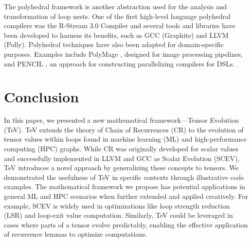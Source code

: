 \documentclass{article}
\begin{document}
    The polyhedral framework is another abstraction used for the analysis and transformation of loop nests.
     One of the first high-level language polyhedral compilers was the R-Stream 3.0 Compiler \cite{Lethin2008RStream3C}
      and several tools and libraries have been developed to harness its benefits, such as GCC (Graphite) and LLVM
       (Polly). Polyhedral techniques have also been adapted for domain-specific purposes. Examples include 
       PolyMage \cite{Polymage}, designed for image processing pipelines, and PENCIL \cite{PENCIL}, 
       an approach for constructing parallelizing compilers for DSLs.


    \section{Conclusion}       
    In this paper, we presented a new mathematical framework—Tensor Evolution (TeV).
     TeV extends the theory of Chain of Recurrences (CR) to the evolution of tensor values
      within loops found in machine learning (ML) and high-performance computing (HPC) graphs.
       While CR was originally developed for scalar values and successfully implemented in LLVM and GCC as Scalar Evolution (SCEV), TeV introduces a novel approach by generalizing these concepts to tensors.
    We demonstrated the usefulness of TeV in specific contexts through illustrative code examples.
     The mathematical framework we propose has potential applications in general ML and HPC
      scenarios when further extended and applied creatively. For example, SCEV is widely
       used in optimizations like loop strength reduction (LSR) and loop-exit value computation.
        Similarly, TeV could be leveraged in cases where parts of a tensor evolve predictably,
         enabling the effective application of recurrence lemmas to optimize computations.

{}

    
\end{document}
